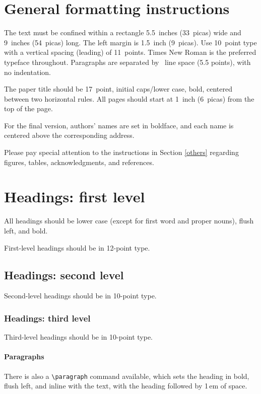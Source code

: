 \documentclass{article}
\begin{document}
\section{General formatting instructions}
\label{gen_inst}


The text must be confined within a rectangle 5.5~inches (33~picas) wide and
9~inches (54~picas) long. The left margin is 1.5~inch (9~picas). Use 10~point
type with a vertical spacing (leading) of 11~points. Times New Roman is the
preferred typeface throughout. Paragraphs are separated by ~line
space (5.5 points), with no indentation.

The paper title should be 17~point, initial caps/lower case, bold, centered
between two horizontal rules. All pages should start at 1~inch (6~picas) from
the top of the page.

For the final version, authors' names are set in boldface, and each name is
centered above the corresponding address.

Please pay special attention to the instructions in Section \ref{others}
regarding figures, tables, acknowledgments, and references.


\section{Headings: first level}
\label{headings}


All headings should be lower case (except for first word and proper nouns),
flush left, and bold.

First-level headings should be in 12-point type.


\subsection{Headings: second level}


Second-level headings should be in 10-point type.


\subsubsection{Headings: third level}


Third-level headings should be in 10-point type.


\paragraph{Paragraphs}


There is also a \verb+\paragraph+ command available, which sets the heading in
bold, flush left, and inline with the text, with the heading followed by 1\,em
of space.
\end{document}
